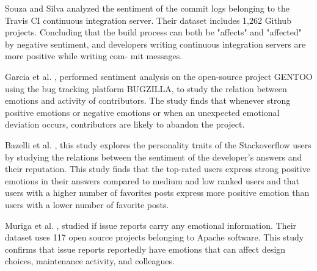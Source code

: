 
Souza and Silva \cite{souza2017sentiment} analyzed the sentiment of the commit logs belonging to the Travis CI continuous integration server. Their dataset includes 1,262 Github projects. Concluding that the build process can both be "affects" and "affected" by negative sentiment, and developers writing continuous integration servers are more positive while writing com- mit messages. 


Garcia et al. \cite{garcia2013role}, performed sentiment analysis on the open-source project GENTOO using the bug tracking platform BUGZILLA, to study the relation between emotions and activity of contributors. The study finds that whenever strong positive emotions or negative emotions or when an unexpected emotional deviation occurs, contributors are likely to abandon the project.


Bazelli et al. \cite{bazelli2013personality}, this study explores the personality traits of the Stackoverflow users by studying the relations between the sentiment of the developer's answers and their reputation. This study finds that the top-rated users express strong positive emotions in their answers compared to medium and low ranked users and that users with a higher number of favorites posts express more positive emotion than users with a lower number of favorite posts.

Muriga et al. \cite{murgia2014developers}, studied if issue reports carry any emotional information. Their dataset uses 117 open source projects belonging to Apache software. This study confirms that issue reports reportedly have emotions that can affect design choices, maintenance activity, and colleagues.



